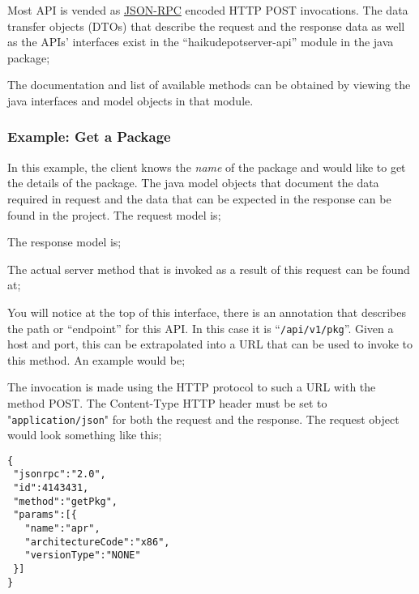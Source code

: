 Most API is vended as \href{http://www.jsonrpc.org}{JSON-RPC} encoded HTTP POST invocations.  The data transfer objects (DTOs) that describe the request and the response data as well as the APIs' interfaces exist in the ``haikudepotserver-api'' module in the java package;


The documentation and list of available methods can be obtained by viewing the java interfaces and model objects in that module.

\subsubsection{Example: Get a Package}

In this example, the client knows the {\it name} of the package and would like to get the details of the package.  The java model objects that document the data required in request and the data that can be expected in the response can be found in the project.  The request model is;


The response model is;


The actual server method that is invoked as a result of this request can be found at;


You will notice at the top of this interface, there is an annotation that describes the path or ``endpoint'' for this API.  In this case it is ``{\tt /api/v1/pkg}''.  Given a host and port, this can be extrapolated into a URL that can be used to invoke to this method.  An example would be;


The invocation is made using the HTTP protocol to such a URL with the method POST.  The Content-Type HTTP header must be set to "{\tt application/json}" for both the request and the response.  The request object would look something like this;

\begin{verbatim}
{
 "jsonrpc":"2.0",
 "id":4143431,
 "method":"getPkg",
 "params":[{
   "name":"apr",
   "architectureCode":"x86",
   "versionType":"NONE"
 }]
}
\end{verbatim}

